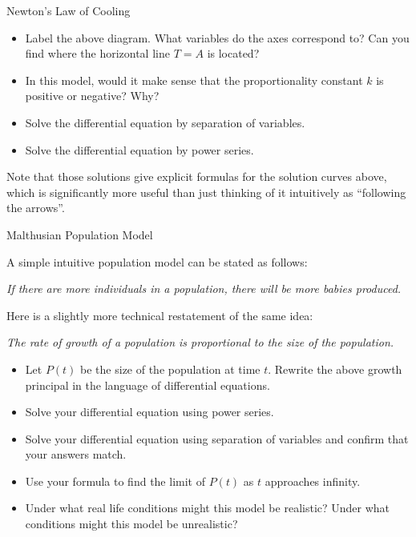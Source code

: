 \begin{exercise}{Newton's Law of Cooling \Coffeecup \Coffeecup }
\begin{itemize}
\item Label the above diagram.  What variables do the axes correspond to?  Can you find where the horizontal line $T=A$ is located?
\vspace*{.5in}
\item  In this model, would it make sense that the proportionality constant $k$ is positive or negative?  Why?
\vspace*{.5in}
\item Solve the differential equation by separation of variables. 
\vspace*{2in}
\item Solve the differential equation by power series. 
\vspace*{4in}
\end{itemize}
\end{exercise}
Note that those solutions give explicit formulas for the solution curves above, which is significantly more useful than just thinking of it intuitively as ``following the arrows''.

\begin{exercise}{ Malthusian Population Model }

A simple intuitive population model can be stated as follows:

\begin{center}
\emph{If there are more individuals in a population, there will be more babies produced.}
\end{center}

Here is a slightly more technical restatement of the same idea:

\begin{center}
\emph{The rate of growth of a population is proportional to the size of the population.}
\end{center}

\begin{itemize}
\item Let $P(t)$ be the size of the population at time $t$.  Rewrite the above growth principal in the language of differential equations.
\vspace*{1in}
\item Solve your differential equation using power series. 
\vspace*{5in}
\item Solve your differential equation using separation of variables and confirm that your answers match.
\vspace*{2in}
\item Use your formula to find the limit of $P(t)$ as $t$ approaches infinity.  
\vspace*{2in}
\item Under what real life conditions might this model be realistic?  Under what conditions might this model be unrealistic?
\vspace*{2in}
\end{itemize}
\end{exercise}

